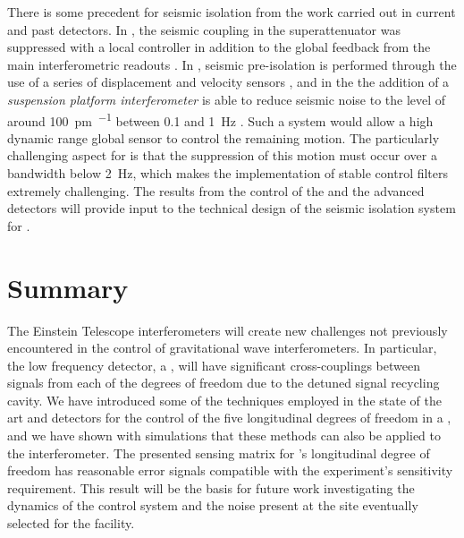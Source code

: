There is some precedent for seismic isolation from the work carried out in current and past detectors. In \VIRGO{}, the seismic coupling in the superattenuator was suppressed with a local controller in addition to the global feedback from the main interferometric readouts \cite{Acernese2004}. In \ALIGO{}, seismic pre-isolation is performed through the use of a series of displacement and velocity sensors \cite{Stochino2009}, and in the \AEIPROTOTYPE{} the addition of a \emph{suspension platform interferometer} \cite{Gossler2010} is able to reduce seismic noise to the level of around \SI{100}{\pico\meter\per\sqrthz} between \num{0.1} and \SI{1}{\hertz} \cite{Dahl2010}. Such a system would allow a high dynamic range global sensor to control the remaining motion. The particularly challenging aspect for \ETLF{} is that the suppression of this motion must occur over a bandwidth below \SI{2}{\hertz}, which makes the implementation of stable control filters extremely challenging. The results from the control of the \AEIPROTOTYPE{} and the advanced detectors will provide input to the technical design of the seismic isolation system for \ETLF{}.

\section{Summary}
The Einstein Telescope interferometers will create new challenges not previously encountered in the control of gravitational wave interferometers. In particular, the low frequency \ETLF{} detector, a \DRFPMI{}, will have significant cross-couplings between signals from each of the degrees of freedom due to the detuned signal recycling cavity. We have introduced some of the techniques employed in the state of the art \ALIGO{} and \AVIRGO{} detectors for the control of the five longitudinal degrees of freedom in a \DRFPMI{}, and we have shown with simulations that these methods can also be applied to the \ETLF{} interferometer. The presented sensing matrix for \ETLF{}'s longitudinal degree of freedom has reasonable error signals compatible with the experiment's sensitivity requirement. This result will be the basis for future work investigating the dynamics of the control system and the noise present at the site eventually selected for the facility.
